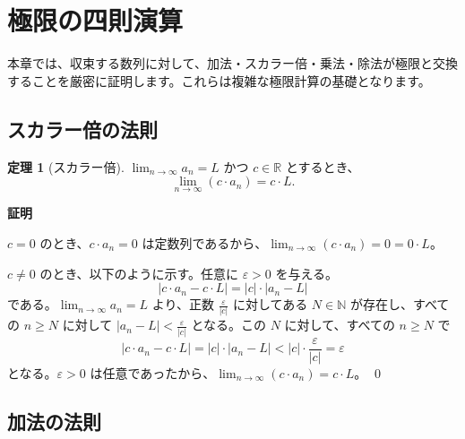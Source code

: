 \documentclass[11pt,a4paper]{jsarticle}
\theoremstyle{definition}
\newtheorem{theorem}{定理}[section]
\newcommand{\N}{\mathbb{N}}
\newcommand{\R}{\mathbb{R}}
\newcommand{\eps}{\varepsilon}
\begin{document}
\newpage

\section{極限の四則演算}\label{sec:arithmetic}

本章では、収束する数列に対して、加法・スカラー倍・乗法・除法が極限と交換することを厳密に証明します。これらは複雑な極限計算の基礎となります。

\subsection{スカラー倍の法則}

\begin{theorembox}[定理：スカラー倍の極限]
\begin{theorem}[スカラー倍]\label{thm:scalar}
$\lim_{n \to \infty} a_n = L$ かつ $c \in \R$ とするとき、
\[
\lim_{n \to \infty} (c \cdot a_n) = c \cdot L.
\]
\end{theorem}
\end{theorembox}

\begin{proofbox}
\textbf{証明}\ \\
\noindent

$c = 0$ のとき、$c \cdot a_n = 0$ は定数列であるから、$\lim_{n \to \infty} (c \cdot a_n) = 0 = 0 \cdot L$。

$c \neq 0$ のとき、以下のように示す。任意に $\eps > 0$ を与える。
\[
|c \cdot a_n - c \cdot L| = |c| \cdot |a_n - L|
\]
である。$\lim_{n \to \infty} a_n = L$ より、正数 $\frac{\eps}{|c|}$ に対してある $N \in \N$ が存在し、すべての $n \geq N$ に対して $|a_n - L| < \frac{\eps}{|c|}$ となる。この $N$ に対して、すべての $n \geq N$ で
\[
|c \cdot a_n - c \cdot L|
= |c| \cdot |a_n - L|
< |c| \cdot \frac{\eps}{|c|}
= \eps
\]
となる。$\eps > 0$ は任意であったから、$\lim_{n \to \infty} (c \cdot a_n) = c \cdot L$。 \qed
\end{proofbox}

\subsection{加法の法則}
\end{document}

